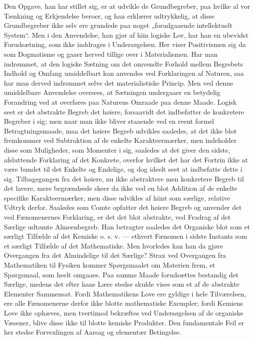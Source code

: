 \documentclass[12pt,a4paper,openany]{book}
\newcommand{\opage}[1]{\marginnote{\footnotesize\textit{[#1]}}}
\begin{document}
Den Opgave, han har stillet sig, er at udvikle de
Grundbegreber, paa hvilke al vor Tænkning og Erkjendelse
beroer, og han erklærer udtrykkelig, at disse Grundbegreber
ikke selv ere grundede paa noget „forudgaaende
intellektuelt System“. Men i den Anvendelse, han gjør af
hiin logiske Lov, har han en ubevidst Forudsætning, som ikke
inddrages i Undersøgelsen. Her viser Positivismen sig da
som Dogmatisme og gaaer herved tillige over i Materialismen.
Har man indrømmet, at den logiske Sætning om
det omvendte Forhold mellem Begrebets Indhold og Omfang
umiddelbart kan anvendes ved Forklaringen af Naturen,
saa har man derved indrømmet selve det materialistiske Princip.
Men ved denne umiddelbare Anvendelse oversees, at
Sætningen undergaaer en betydelig Forandring ved at overføres
paa Naturens Omraade paa denne Maade. Logisk seet
er det abstrakte Begreb det høiere, forsaavidt det indbefatter
de konkretere Begreber i sig; men naar man ikke bliver
staaende ved en reent formel Betragtningsmaade, maa det
\opage{204}høiere Begreb udvikles saaledes, at det ikke blot fremkommer
ved Subtraktion af de enkelte Karakteermærker, men indeholder
disse som Muligheder, som Momenter i sig, saaledes at det
giver den sidste, afsluttende Forklaring af det Konkrete, overfor
hvilket det har det Fortrin ikke at være bundet til det
Enkelte og Endelige, og dog ideelt seet at indbefatte dette i
sig. Tilbagegangen fra det høiere, nu ikke abstraktere men
konkretere Begreb til det lavere, mere begrændsede skeer da
ikke ved en blot Addition af de enkelte specifike Karakteermærker,
men disse udvikles af hiint som særlige, relative
Udtryk derfor. Saaledes som Comte opfatter det høiere Begreb
og anvender det ved Fænomenernes Forklaring, er det
det blot abstrakte, ved Fradrag af det Særlige udtømte
Almeenbegreb. Han betragter saaledes det Organiske blot
som et særligt Tilfælde af det Kemiske o. s. v. --- ethvert
Fænomen i sidste Instants som et særligt Tilfælde af det
Mathematiske. Men hvorledes kan han da gjøre Overgangen
fra det Almindelige til det Særlige? Strax ved Overgangen
fra Mathematiken til Fysiken kommer Spørgsmaalet om
Materien frem, et Spørgsmaal, som heelt omgaaes. Paa
samme Maade forudsættes bestandig det Særlige, medens det
efter hans Lære stedse skulde vises som et af de abstrakte
Elementer Sammensat. Fordi Mathematikens Love ere gyldige
i hele Tilværelsen, ere alle Fænomenerne derfor ikke
blotte mathematiske Exempler; fordi Kemiens Love ikke ophæves,
men tvertimod bekræftes ved Undersøgelsen af de
organiske Væsener, blive disse ikke til blotte kemiske Produkter.
Den fundamentale Feil er her stedse Forvexlingen af Aarsag
og elementær Betingelse.
\end{document}
